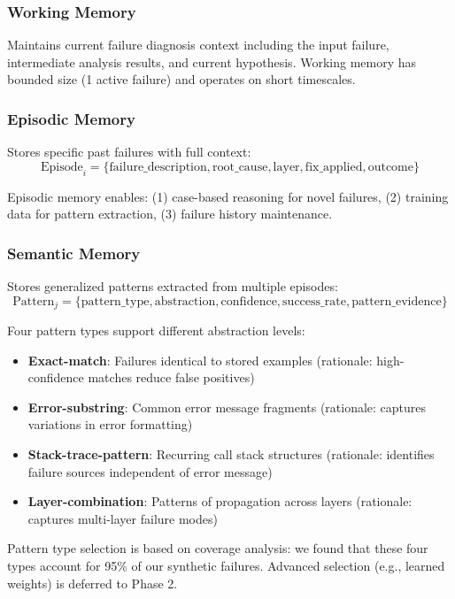 \documentclass[11pt]{article}
\begin{document}
\subsubsection{Working Memory}
Maintains current failure diagnosis context including the input failure, intermediate analysis results, and current hypothesis. Working memory has bounded size (1 active failure) and operates on short timescales.

\subsubsection{Episodic Memory}
Stores specific past failures with full context:
\begin{equation}
\text{Episode}_i = \{\text{failure\_description}, \text{root\_cause}, \text{layer}, \text{fix\_applied}, \text{outcome}\}
\end{equation}

Episodic memory enables: (1) case-based reasoning for novel failures, (2) training data for pattern extraction, (3) failure history maintenance.

\subsubsection{Semantic Memory}
Stores generalized patterns extracted from multiple episodes:
\begin{equation}
\text{Pattern}_j = \{\text{pattern\_type}, \text{abstraction}, \text{confidence}, \text{success\_rate}, \text{pattern\_evidence}\}
\end{equation}

Four pattern types support different abstraction levels:
\begin{itemize}
    \item \textbf{Exact-match}: Failures identical to stored examples (rationale: high-confidence matches reduce false positives)
    \item \textbf{Error-substring}: Common error message fragments (rationale: captures variations in error formatting)
    \item \textbf{Stack-trace-pattern}: Recurring call stack structures (rationale: identifies failure sources independent of error message)
    \item \textbf{Layer-combination}: Patterns of propagation across layers (rationale: captures multi-layer failure modes)
\end{itemize}

Pattern type selection is based on coverage analysis: we found that these four types account for 95\% of our synthetic failures. Advanced selection (e.g., learned weights) is deferred to Phase 2.
\end{document}

